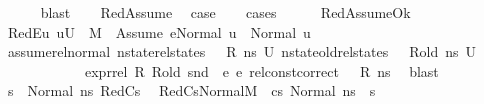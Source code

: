 \begin{isabellebody}
\ \ \ \ \isamarkupfalse%
\ blast\isanewline
\ \ \isamarkupfalse%
\ RedAssume\ \isamarkupfalse%
\ {\isacharquery}{\kern0pt}case\isanewline
\ \ \isamarkupfalse%
\ cases\isanewline
\ \ \ \ \isamarkupfalse%
\ RedAssumeOk\isanewline
\ \ \ \ \isamarkupfalse%
\ RedE{}{\isacharcolon}{\kern0pt}{\isachardoublequoteopen}{\isasymAnd}u{\isachardot}{\kern0pt}\ u{\isasymin}U{}\ {\isasymLongrightarrow}\ M{\isacharcomma}{\kern0pt}{\isasymLambda}{\isacharprime}{\kern0pt}{\isacharcomma}{\kern0pt}{\isasymGamma}{\isacharcomma}{\kern0pt}{\isasymOmega}\ {\isasymturnstile}\ {\isasymlangle}Assume\ e{}{\isacharcomma}{\kern0pt}Normal\ u{\isasymrangle}\ {\isasymrightarrow}\ Normal\ u{\isachardoublequoteclose}\isanewline
\ \ \ \ \ \ \isamarkupfalse%
\ assume{\isacharunderscore}{\kern0pt}rel{\isacharunderscore}{\kern0pt}normal\ {\isacartoucheopen}nstate{\isacharunderscore}{\kern0pt}rel{\isacharunderscore}{\kern0pt}states\ {\isasymLambda}\ {\isasymLambda}{\isacharprime}{\kern0pt}\ R\ ns\ U{}{\isacartoucheclose}\ {\isacartoucheopen}nstate{\isacharunderscore}{\kern0pt}old{\isacharunderscore}{\kern0pt}rel{\isacharunderscore}{\kern0pt}states\ {\isasymLambda}\ {\isasymLambda}{\isacharprime}{\kern0pt}\ R{\isacharunderscore}{\kern0pt}old\ ns\ U{}{\isacartoucheclose}\isanewline
\ \ \ \ \ \ \ \ \ \ \ \ {\isacartoucheopen}expr{\isacharunderscore}{\kern0pt}rel\ R\ R{\isacharunderscore}{\kern0pt}old\ {\isacharparenleft}{\kern0pt}snd\ {\isasymLambda}{\isacharparenright}{\kern0pt}\ e{}\ e{}{\isacartoucheclose}\ {\isacartoucheopen}rel{\isacharunderscore}{\kern0pt}const{\isacharunderscore}{\kern0pt}correct\ {\isasymLambda}\ {\isasymOmega}\ R\ ns{\isacartoucheclose}\ \isamarkupfalse%
\ blast\isanewline
\ \ \ \ \isamarkupfalse%
\ {\isacartoucheopen}s{\isacharprime}{\kern0pt}{\isacharprime}{\kern0pt}\ {\isacharequal}{\kern0pt}\ Normal\ ns{\isacartoucheclose}\ RedCs{}\ \isamarkupfalse%
\ RedCs{}Normal{\isacharcolon}{\kern0pt}{\isachardoublequoteopen}M{\isacharcomma}{\kern0pt}{\isasymLambda}{\isacharcomma}{\kern0pt}{\isasymGamma}{\isacharcomma}{\kern0pt}{\isasymOmega}\ {\isasymturnstile}\ {\isasymlangle}cs{}{\isacharcomma}{\kern0pt}\ Normal\ ns{\isasymrangle}\ {\isacharbrackleft}{\kern0pt}{\isasymrightarrow}{\isacharbrackright}{\kern0pt}\ s{\isacharprime}{\kern0pt}{\isachardoublequoteclose}\ \isamarkupfalse%

\end{isabellebody}
